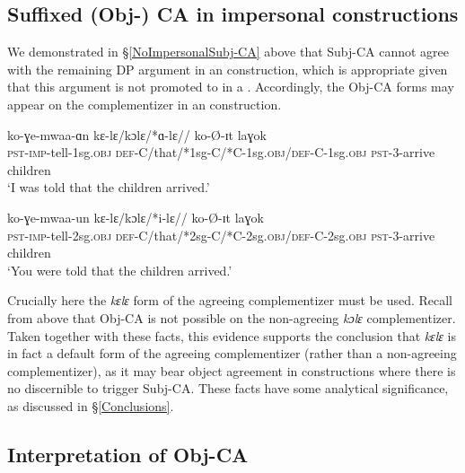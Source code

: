 \documentclass[output=paper
,newtxmath
,modfonts
,nonflat]{langsci/langscibook}
\begin{document}
\subsection{Suffixed (Obj-) CA in impersonal constructions}
We demonstrated in \S \ref{NoImpersonalSubj-CA} above that Subj-CA cannot agree with the remaining DP argument in an  construction, which is appropriate given that this argument is not promoted to  in a  . Accordingly, the Obj-CA forms may appear on the complementizer in an  construction. 

\ea
\begin{xlist}

\ex
\gll ko-ɣe-mwaa-ɑn kɛ-lɛ/kɔlɛ/*ɑ-lɛ// ko-\O-ɪt laɣok  \\
\textsc{pst}-\textsc{imp}-tell-1sg.\textsc{obj} \textsc{def}-C/that/*1sg-C/*C-1sg.\textsc{obj}/\textsc{def}-C-1sg.\textsc{obj} \textsc{pst}-3-arrive children \\
\glt `I was told that the children arrived.' 

\ex
\gll ko-ɣe-mwaa-un kɛ-lɛ/kɔlɛ/*i-lɛ// ko-\O-ɪt laɣok \\
\textsc{pst}-\textsc{imp}-tell-2sg.\textsc{obj} \textsc{def}-C/that/*2sg-C/*C-2sg.\textsc{obj}/\textsc{def}-C-2sg.\textsc{obj} \textsc{pst}-3-arrive children\\
\glt `You were told that the children arrived.' 

\end{xlist}
\z

\noindent Crucially here the \textit{kɛlɛ} form of the agreeing complementizer must be used. Recall from above that Obj-CA is not possible on the non-agreeing \textit{kɔlɛ} complementizer. Taken together with these facts, this evidence  supports the conclusion that \textit{kɛlɛ} is in fact a default form of the agreeing complementizer (rather than a non-agreeing complementizer), as it may bear object agreement in  constructions where there is no discernible  to trigger Subj-CA. These facts have some analytical significance, as discussed in \S \ref{Conclusions}.

\subsection{Interpretation of Obj-CA} \label{Obj-CA Interpretation}
\end{document}
